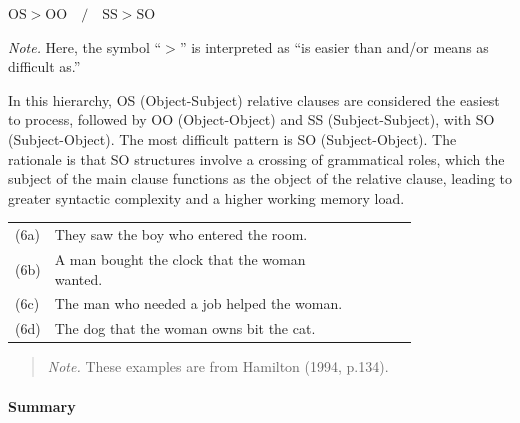 \documentclass[
]{article}
\begin{document}
\vspace{1em}

\(\text{OS} > \text{OO} \quad / \quad \text{SS} > \text{SO}\)

\textit{Note.} Here, the symbol ``\(>\)'' is interpreted as ``is easier
than and/or means as difficult as.''

\vspace{1em}

In this hierarchy, OS (Object-Subject) relative clauses are considered
the easiest to process, followed by OO (Object-Object) and SS
(Subject-Subject), with SO (Subject-Object). The most difficult pattern
is SO (Subject-Object). The rationale is that SO structures involve a
crossing of grammatical roles, which the subject of the main clause
functions as the object of the relative clause, leading to greater
syntactic complexity and a higher working memory load.

\vspace{1em}

\setlength{\parindent}{0pt}
\noindent
\begin{tabular}[t]{@{}p{0.05\linewidth} p{0.75\linewidth} >{\raggedleft\arraybackslash}p{2.5cm}@{}}
(6a) & They saw the boy who entered the room. & [OS] \\
(6b) & A man bought the clock that the woman wanted. & [OO] \\
(6c) & The man who needed a job helped the woman. & [SS] \\
(6d) & The dog that the woman owns bit the cat. & [SO] \\
\end{tabular}

\vspace{0.5em}

\noindent
\begin{quote}
\small
\textit{Note.} These examples are from Hamilton (1994, p.134).
\end{quote}

\vspace{1em}

\paragraph{Summary}\label{summary}
\end{document}
